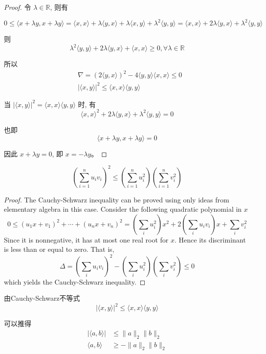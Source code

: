 \begin{proof}
    令 $\lambda \in \mathbb{R}$, 则有 
    
    $$0 \leq\langle x+\lambda y, x+\lambda y\rangle=\langle x, x\rangle+\lambda\langle y, x\rangle+\lambda\langle x, y\rangle+\lambda^{2}\langle y, y\rangle=\langle x, x\rangle+2 \lambda\langle y, x\rangle+\lambda^{2}\langle y, y\rangle$$

则 
$$\lambda^{2}\langle y, y\rangle+2 \lambda\langle y, x\rangle+\langle x, x\rangle \geq 0, \forall \lambda \in \mathbb{R}$$

所以
$$
\begin{aligned}
&\nabla=(2\langle y, x\rangle)^{2}-4\langle y, y\rangle\langle x, x\rangle \leq 0 \\
&|\langle x, y\rangle|^{2} \leq\langle x, x\rangle\langle y, y\rangle
\end{aligned}
$$

当 $|\langle x, y\rangle|^{2}=\langle x, x\rangle\langle y, y\rangle$ 时, 有 $$\langle x, x\rangle^{2}+2 \lambda\langle y, x\rangle+\lambda^{2}\langle y, y\rangle=0$$

也即 $$\langle x+\lambda y, x+\lambda y\rangle=0$$

因此 $x+\lambda y=0$, 即 $x=-\lambda y$。
\end{proof}

\begin{theorem}

    $$\left(\sum_{i=1}^{n} u_{i} v_{i}\right)^{2} \leq\left(\sum_{i=1}^{n} u_{i}^{2}\right)\left(\sum_{i=1}^{n} v_{i}^{2}\right)$$
\end{theorem}

\begin{proof}
    The Cauchy-Schwarz inequality can be proved using only ideas from elementary algebra in this case. Consider the following quadratic polynomial in $x$
$$
0 \leq\left(u_{1} x+v_{1}\right)^{2}+\cdots+\left(u_{n} x+v_{n}\right)^{2}=\left(\sum_{i} u_{i}^{2}\right) x^{2}+2\left(\sum_{i} u_{i} v_{i}\right) x+\sum_{i} v_{i}^{2}
$$
Since it is nonnegative, it has at most one real root for $x$. Hence its discriminant is less than or equal to zero. That is,
$$
\Delta = \left(\sum_{i} u_{i} v_{i}\right)^{2}-\left(\sum_{i} u_{i}^{2}\right)\left(\sum_{i} v_{i}^{2}\right) \leq 0
$$
which yields the Cauchy-Schwarz inequality.
\end{proof}

\begin{corollary}
    由Cauchy-Schwarz不等式
    $$
    |\langle x, y\rangle|^{2} \leq\langle x, x\rangle\langle y, y\rangle
    $$

    可以推得
    $$\begin{aligned}
        |\langle a,b \rangle| &\le \| a \|_2 \| b \|_2\\
        \langle a,b \rangle &\ge -\| a \|_2 \| b \|_2
    \end{aligned} $$
\end{corollary}



